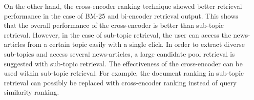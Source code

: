 On the other hand, the cross-encoder ranking technique showed better retrieval performance in the case of BM-25 and bi-encoder retrieval output. This shows that the overall performance of the cross-encoder is better than sub-topic retrieval. However, in the case of sub-topic retrieval, the user can access the news-articles from a certain topic easily with a single click. In order to extract diverse sub-topics and access several news-articles, a large candidate pool retrieval is suggested with sub-topic retrieval. The effectiveness of the cross-encoder can be used within sub-topic retrieval. For example, the document ranking in sub-topic retrieval can possibly be replaced with cross-encoder ranking instead of query similarity ranking.


 


